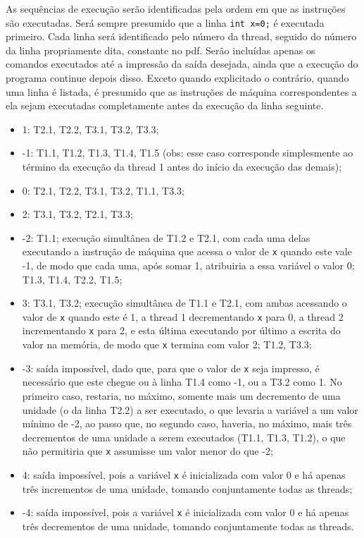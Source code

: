 \documentclass{article}
\begin{document}
\begin{large}
\end{large}

As sequências de execução serão identificadas pela ordem em que as instruções são executadas. Será sempre presumido que a linha \texttt{int x=0;} é executada primeiro. Cada linha será identificado pelo número da thread, seguido do número da linha propriamente dita, constante no pdf. Serão incluídas apenas os comandos executados até a impressão da saída desejada, ainda que a execução do programa continue depois disso. Exceto quando explicitado o contrário, quando uma linha é listada, é presumido que as instruções de máquina correspondentes a ela sejam executadas completamente antes da execução da linha seguinte.

\begin{itemize}
  \item 1: T2.1, T2.2, T3.1, T3.2, T3.3;
  \item -1: T1.1, T1.2, T1.3, T1.4, T1.5 (obs: esse caso corresponde simplesmente ao término da execução da thread 1 antes do início da execução das demais);
  \item 0: T2.1, T2.2, T3.1, T3.2, T1.1, T3.3;
  \item 2: T3.1, T3.2, T2.1, T3.3;
  \item -2: T1.1; execução simultânea de T1.2 e T2.1, com cada uma delas executando a instrução de máquina que acessa o valor de \texttt{x} quando este vale -1, de modo que cada uma, após somar 1, atribuiria a essa variável o valor 0; T1.3, T1.4, T2.2, T1.5;
  \item 3: T3.1, T3.2; execução simultânea de T1.1 e T2.1, com ambas acessando o valor de \texttt{x} quando este é 1, a thread 1 decrementando \texttt{x} para 0, a thread 2 incrementando \texttt{x} para 2, e esta última executando por último a escrita do valor na memória, de modo que \texttt{x} termina com valor 2; T1.2, T3.3;
  \item -3: saída impossível, dado que, para que o valor de \texttt{x} seja impresso, é necessário que este chegue ou à linha T1.4 como -1, ou a T3.2 como 1. No primeiro caso, restaria, no máximo, somente mais um decremento de uma unidade (o da linha T2.2) a ser executado, o que levaria a variável a um valor mínimo de -2, ao passo que, no segundo caso, haveria, no máximo, mais três decrementos de uma unidade a serem executados (T1.1, T1.3, T1.2), o que não permitiria que \texttt{x} assumisse um valor menor do que -2;
  \item 4: saída impossível, pois a variável \texttt{x} é inicializada com valor 0 e há apenas três incrementos de uma unidade, tomando conjuntamente todas as threads;
  \item -4: saída impossível, pois a variável \texttt{x} é inicializada com valor 0 e há apenas três decrementos de uma unidade, tomando conjuntamente todas as threads.
\end{itemize}
\end{document}
